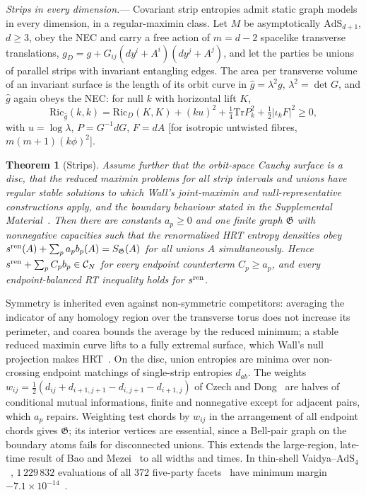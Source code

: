 \documentclass[aps,prl,twocolumn,superscriptaddress,nofootinbib,amsmath,amssymb]{revtex4-2}
\newtheorem{theorem}{Theorem}
\theoremstyle{definition}
\newcommand{\CN}{\mathcal{C}_N}
\newcommand{\SM}{Supplemental Material~\cite{SM}}
\begin{document}
\emph{Strips in every dimension.}---%
Covariant strip entropies admit static graph models in every dimension, in a regular-maximin class. Let $M$ be
asymptotically $\mathrm{AdS}_{d+1}$, $d\ge3$, obey the NEC and carry a free action of $m=d-2$ spacelike transverse
translations, $g_D=g+G_{ij}(dy^i+A^i)(dy^j+A^j)$, and let the parties be unions of parallel strips with invariant
entangling edges. The area per transverse volume of an invariant surface is the length of its orbit curve in
$\hat g=\lambda^2g$, $\lambda^2=\det G$, and $\hat g$ again obeys the NEC: for null $k$ with horizontal lift $K$,
\begin{equation}\label{eq:KKric}
\mathrm{Ric}_{\hat g}(k,k)=\mathrm{Ric}_D(K,K)+(ku)^2+\tfrac14\mathrm{Tr}P_k^2+\tfrac12|\iota_kF|^2\ge0,
\end{equation}
with $u=\log\lambda$, $P=G^{-1}dG$, $F=dA$ [for isotropic untwisted fibres, $m(m+1)(k\phi)^2$].

\begin{theorem}[Strips]\label{thm:strips}
Assume further that the orbit-space Cauchy surface is a disc, that the reduced maximin problems for all strip
intervals and unions have regular stable solutions to which Wall's joint-maximin and null-representative
constructions apply, and the boundary behaviour stated in the \SM. Then there are constants $a_p\ge0$ and one finite
graph $\mathfrak G$ with nonnegative capacities such that the renormalised HRT entropy densities obey
$s^{\rm ren}(A)+\sum_pa_pb_p(A)=S_{\mathfrak G}(A)$ for all unions $A$ simultaneously. Hence $s^{\rm ren}+\sum_pC_pb_p\in\CN$
for every endpoint counterterm $C_p\ge a_p$, and every endpoint-balanced RT inequality holds for $s^{\rm ren}$.
\end{theorem}

Symmetry is inherited even against non-symmetric competitors: averaging the indicator of any homology region over
the transverse torus does not increase its perimeter, and coarea bounds the average by the reduced minimum; a stable
reduced maximin curve lifts to a fully extremal surface, which Wall's null projection makes
HRT~\cite{Wall2014,Sorce2019,SM}. On the disc, union entropies are minima over non-crossing endpoint matchings of
single-strip entropies $d_{ab}$. The weights $w_{ij}=\frac12(d_{ij}+d_{i+1,j+1}-d_{i,j+1}-d_{i+1,j})$ of Czech and
Dong~\cite{CzechDong2019} are halves of conditional mutual informations, finite and nonnegative except for adjacent
pairs, which $a_p$ repairs. Weighting test chords by $w_{ij}$ in the arrangement of all endpoint chords gives
$\mathfrak G$; its interior vertices are essential, since a Bell-pair graph on the boundary atoms fails for
disconnected unions. This extends the large-region, late-time result of Bao and Mezei~\cite{BaoMezei2018} to all
widths and times. In thin-shell Vaidya--$\mathrm{AdS}_4$~\cite{LiuSuh2014}, $1\,229\,832$ evaluations of all 372
five-party facets~\cite{HernandezCuenca2019} have minimum margin $-7.1\times10^{-14}$~\cite{SM}.
\end{document}
